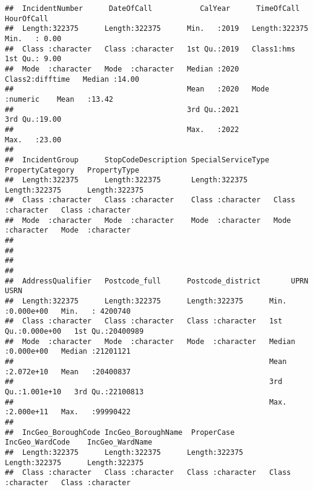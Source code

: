 \documentclass[
]{article}
\begin{document}
\begin{verbatim}
##  IncidentNumber      DateOfCall           CalYear      TimeOfCall         HourOfCall   
##  Length:322375      Length:322375      Min.   :2019   Length:322375     Min.   : 0.00  
##  Class :character   Class :character   1st Qu.:2019   Class1:hms        1st Qu.: 9.00  
##  Mode  :character   Mode  :character   Median :2020   Class2:difftime   Median :14.00  
##                                        Mean   :2020   Mode  :numeric    Mean   :13.42  
##                                        3rd Qu.:2021                     3rd Qu.:19.00  
##                                        Max.   :2022                     Max.   :23.00  
##                                                                                        
##  IncidentGroup      StopCodeDescription SpecialServiceType PropertyCategory   PropertyType      
##  Length:322375      Length:322375       Length:322375      Length:322375      Length:322375     
##  Class :character   Class :character    Class :character   Class :character   Class :character  
##  Mode  :character   Mode  :character    Mode  :character   Mode  :character   Mode  :character  
##                                                                                                 
##                                                                                                 
##                                                                                                 
##                                                                                                 
##  AddressQualifier   Postcode_full      Postcode_district       UPRN                USRN         
##  Length:322375      Length:322375      Length:322375      Min.   :0.000e+00   Min.   : 4200740  
##  Class :character   Class :character   Class :character   1st Qu.:0.000e+00   1st Qu.:20400989  
##  Mode  :character   Mode  :character   Mode  :character   Median :0.000e+00   Median :21201121  
##                                                           Mean   :2.072e+10   Mean   :20400837  
##                                                           3rd Qu.:1.001e+10   3rd Qu.:22100813  
##                                                           Max.   :2.000e+11   Max.   :99990422  
##                                                                                                 
##  IncGeo_BoroughCode IncGeo_BoroughName  ProperCase        IncGeo_WardCode    IncGeo_WardName   
##  Length:322375      Length:322375      Length:322375      Length:322375      Length:322375     
##  Class :character   Class :character   Class :character   Class :character   Class :character  

\end{verbatim}
\end{document}
